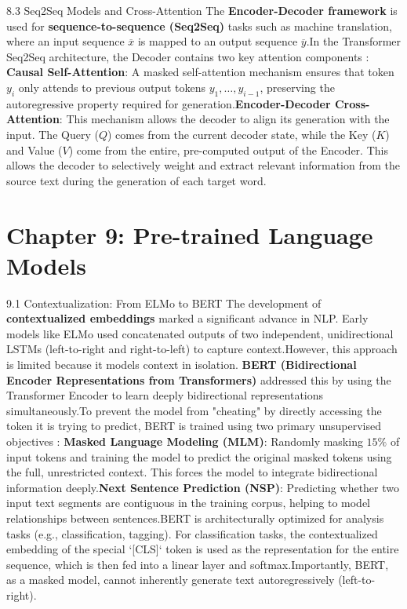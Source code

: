 \documentclass{article}
\begin{document}
8.3 Seq2Seq Models and Cross-Attention
The \textbf{Encoder-Decoder framework} is used for \textbf{sequence-to-sequence (Seq2Seq)} tasks such as machine translation, where an input sequence $\overline{x}$ is mapped to an output sequence $\overline{y}$.\footnotemark[1]
In the Transformer Seq2Seq architecture, the Decoder contains two key attention components \footnotemark[1]:
\textbf{Causal Self-Attention}: A masked self-attention mechanism ensures that token $y_i$ only attends to previous output tokens $y_1, \dots, y_{i-1}$, preserving the autoregressive property required for generation.\footnotemark[1]
\textbf{Encoder-Decoder Cross-Attention}: This mechanism allows the decoder to align its generation with the input. The Query ($Q$) comes from the current decoder state, while the Key ($K$) and Value ($V$) come from the entire, pre-computed output of the Encoder. This allows the decoder to selectively weight and extract relevant information from the source text during the generation of each target word.\footnotemark[1]

\section{Chapter 9: Pre-trained Language Models}
9.1 Contextualization: From ELMo to BERT
The development of \textbf{contextualized embeddings} marked a significant advance in NLP. Early models like ELMo used concatenated outputs of two independent, unidirectional LSTMs (left-to-right and right-to-left) to capture context.\footnotemark[1] However, this approach is limited because it models context in isolation.
\textbf{BERT (Bidirectional Encoder Representations from Transformers)} addressed this by using the Transformer Encoder to learn deeply bidirectional representations simultaneously.\footnotemark[1] To prevent the model from "cheating" by directly accessing the token it is trying to predict, BERT is trained using two primary unsupervised objectives \footnotemark[1]:
\textbf{Masked Language Modeling (MLM)}: Randomly masking $15\%$ of input tokens and training the model to predict the original masked tokens using the full, unrestricted context. This forces the model to integrate bidirectional information deeply.\footnotemark[1]
\textbf{Next Sentence Prediction (NSP)}: Predicting whether two input text segments are contiguous in the training corpus, helping to model relationships between sentences.\footnotemark[1]
BERT is architecturally optimized for analysis tasks (e.g., classification, tagging). For classification tasks, the contextualized embedding of the special `[CLS]` token is used as the representation for the entire sequence, which is then fed into a linear layer and softmax.\footnotemark[1] Importantly, BERT, as a masked model, cannot inherently generate text autoregressively (left-to-right).\footnotemark[1]
\end{document}
